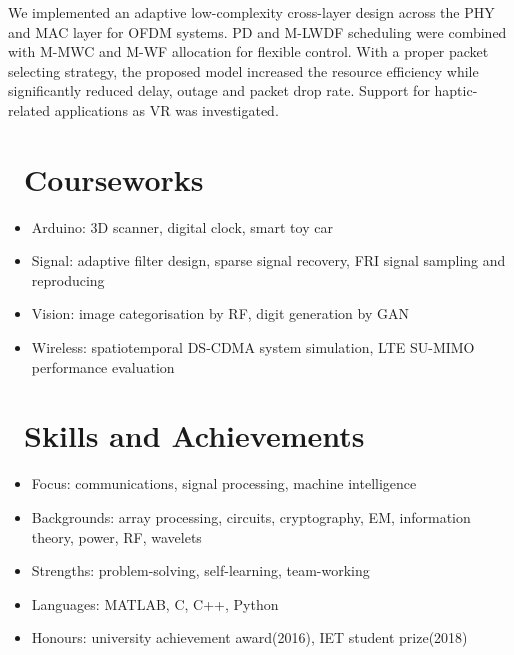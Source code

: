 \documentclass{resume}
\begin{document}
We implemented an adaptive low-complexity cross-layer design across the PHY and MAC layer for OFDM systems. PD and M-LWDF scheduling were combined with M-MWC and M-WF allocation for flexible control. With a proper packet selecting strategy, the proposed model increased the resource efficiency while significantly reduced delay, outage and packet drop rate. Support for haptic-related applications as VR was investigated.

\section{\faTasks\ Courseworks}

\begin{itemize}[noitemsep,nolistsep]
  \item Arduino: 3D scanner, digital clock, smart toy car
  \item Signal: adaptive filter design, sparse signal recovery, FRI signal sampling and reproducing
  \item Vision: image categorisation by RF, digit generation by GAN
  \item Wireless: spatiotemporal DS-CDMA system simulation, LTE SU-MIMO performance evaluation
\end{itemize}

\section{\faHeartO\ Skills and Achievements}

\begin{itemize}[noitemsep,nolistsep]
  \item Focus: communications, signal processing, machine intelligence
  \item Backgrounds: array processing, circuits, cryptography, EM, information theory, power, RF, wavelets
  \item Strengths: problem-solving, self-learning, team-working
  \item Languages: MATLAB, C, C++, Python
  \item Honours: university achievement award(2016), IET student prize(2018)
\end{itemize}


%
%
\end{document}
